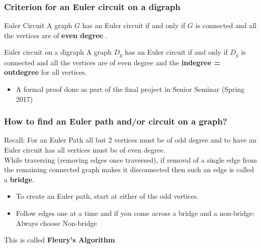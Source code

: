 \documentclass{beamer}
\begin{document}

\begin{frame}
\frametitle{Criterion for an Euler circuit on a digraph}
\begin{block}{Euler Circuit}
A graph $G$ has an Euler circuit if and only if $G$ is connected and all the vertices are of \textbf{even degree} . 
\end{block}
\begin{block}{Euler circuit on a digraph}
A graph $D_g$ has an Euler circuit if and only if $D_g$ is connected and all the vertices are of even degree and the \textbf{indegree = outdegree}
for all vertices.
\end{block}
\begin{itemize}
\item A formal proof done as part of the final project in Senior Seminar (Spring 2017)
\end{itemize}
\end{frame}


\begin{frame}
\frametitle{How to find an Euler path and/or circuit on a graph?}
Recall: For an Euler Path all but 2 vertices must be of odd degree and to have an Euler circuit has all vertices must be of even degree.
\pause
\\  While traversing (removing edges once traversed), if removal of a single edge from the remaining connected graph makes it disconnected then such an edge is called a \textbf{bridge}.

\begin{itemize}

\item To create an Euler path, start at either of the odd vertices.
\pause
\item Follow edges one at a time and if you come across a bridge and a non-bridge: Always choose Non-bridge
\end{itemize}
\pause
This is called \textbf{Fleury's Algorithm}
\end{frame}

\end{document}

